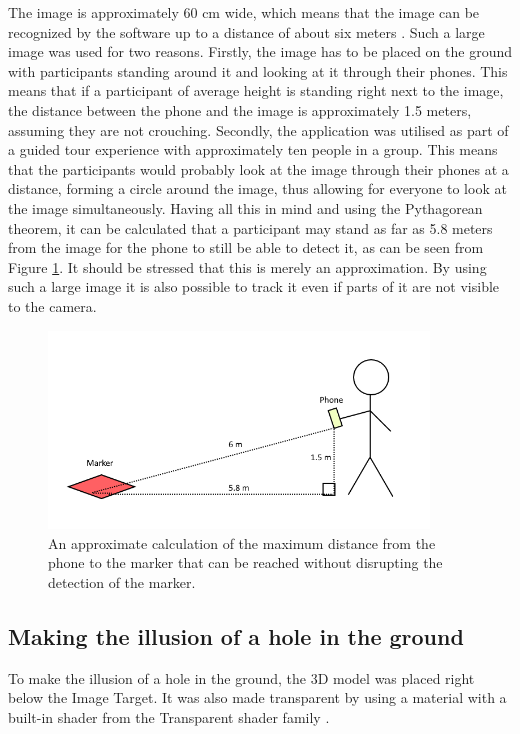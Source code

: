 The image is approximately 60 cm wide, which means that the image can be recognized by the software up to a distance of about six meters \cite{calculate_distance_from_image}. Such a large image was used for two reasons. Firstly, the image has to be placed on the ground with participants standing around it and looking at it through their phones. This means that if a participant of average height is standing right next to the image, the distance between the phone and the image is approximately 1.5 meters, assuming they are not crouching. Secondly, the application was utilised as part of a guided tour experience with approximately ten people in a group. This means that the participants would probably look at the image through their phones at a distance, forming a circle around the image, thus allowing for everyone to look at the image simultaneously. Having all this in mind and using the Pythagorean theorem, it can be calculated that a participant may stand as far as 5.8 meters from the image for the phone to still be able to detect it, as can be seen from Figure \ref{fig:imp3}. It should be stressed that this is merely an approximation. By using such a large image it is also possible to track it even if parts of it are not visible to the camera. 

\begin{figure}[h!]
    \centering
    \includegraphics[width=0.9\textwidth]{figures/imp3.png}
    \caption{An approximate calculation of the maximum distance from the phone to the marker that can be reached without disrupting the detection of the marker.}\label{fig:imp3}
\end{figure}

\subsection{Making the illusion of a hole in the ground}
To make the illusion of a hole in the ground, the 3D model was placed right below the Image Target. It was also made transparent by using a material with a built-in shader from the Transparent shader family \cite{unity_legacy_shaders}.

